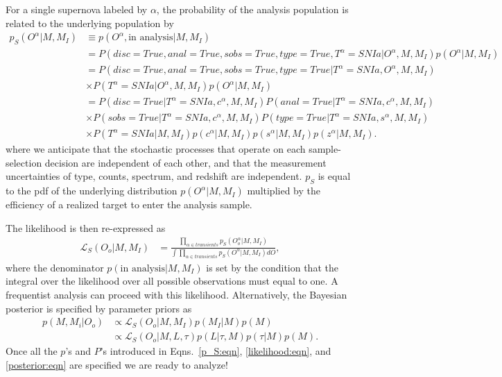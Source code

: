 \documentclass[preprint,3p]{elsarticle}
\begin{document}
For a single supernova labeled by $\alpha$,   the probability of the analysis population is related
to the underlying population by
\begin{align}
p_S(O^\alpha|M, M_I) &\equiv p(O^\alpha, \text{in analysis}|M, M_I) \nonumber \\
& = P(disc=True, anal=True, sobs=True, type=True, T^\alpha=SNIa|O^\alpha, M, M_I)p(O^\alpha|M, M_I) \nonumber \\
& = P(disc=True, anal=True, sobs=True, type=True|T^\alpha=SNIa, O^\alpha, M, M_I) \nonumber \\
& \times P(T^\alpha=SNIa| O^\alpha, M, M_I)p(O^\alpha|M, M_I) \nonumber \\
&= P(disc=True|T^\alpha=SNIa,c^\alpha, M, M_I)
P(anal=True|T^\alpha=SNIa,c^\alpha, M, M_I)  \nonumber \\
&  \times P(sobs=True|T^\alpha=SNIa,c^\alpha, M, M_I)
 P(type=True|T^\alpha=SNIa, s^\alpha, M, M_I) \nonumber \\
&  \times
P(T^\alpha=SNIa| M, M_I)p(c^\alpha|M, M_I)p(s^\alpha|M, M_I)p(z^\alpha|M, M_I).
\label{p_S:eqn}
\end{align}
where we anticipate that the stochastic processes that operate on each sample-selection decision
are independent of each other, and that the measurement uncertainties of type, counts,
spectrum, and redshift are independent.
$p_S$ is equal to the pdf of the underlying
distribution $p(O^\alpha|M, M_I)$ multiplied by the efficiency of a realized target to
enter the analysis sample.

The likelihood is then  re-expressed as
\begin{align}
\mathcal{L}_S(O_o | M, M_I) & = \frac{\prod_{\alpha \in transients}p_S(O_o^\alpha|M, M_I)}{\int  \prod_{\alpha \in transients} p_S(O^\alpha |M, M_I)dO},
\label{likelihood:eqn}
\end{align}
where  the denominator $p(\text{in analysis}|M, M_I)$ is set
by the condition that the integral over the likelihood over all possible
observations must equal to one.
A frequentist analysis can proceed with this likelihood.
Alternatively, the Bayesian posterior is specified by parameter priors as 
\begin{align}
p(M, M_i | O_o) & \propto \mathcal{L}_S(O_o| M, M_I) p(M_I|M) p(M) \nonumber \\
 & \propto \mathcal{L}_S(O_o| M, L, \tau) p(L| \tau, M) p(\tau|M) p(M).
\label{posterior:eqn}
\end{align}
Once all the $p$'s and $P$'s introduced in
Eqns.~\ref{p_S:eqn}, \ref{likelihood:eqn}, and \ref{posterior:eqn}
are specified we are ready to analyze!
\end{document}
